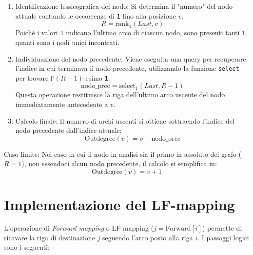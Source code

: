 \documentclass[a4paper,11pt]{article}
\begin{document}
\begin{enumerate}
    \item Identificazione lessicografica del nodo: Si determina il "numero" del nodo attuale contando le occorrenze di \texttt{1} fino alla posizione $v$.
    $$ R = \text{rank}_1(Last, v) $$
    Poiché i valori \texttt{1} indicano l'ultimo arco di ciascun nodo, sono presenti tanti \texttt{1} quanti sono i nodi unici incontrati.
    
    \item Individuazione del nodo precedente: Viene eseguita una query per recuperare l'indice in cui terminava il nodo precedente, utilizzando la funzione \texttt{select} per trovare l'$(R-1)$-esimo \texttt{1}:
    $$ \text{nodo\_prec} = \text{select}_1(Last, R-1) $$
    Questa operazione restituisce la riga dell'ultimo arco uscente del nodo immediatamente antecedente a $v$.
    
    \item Calcolo finale: Il numero di archi uscenti si ottiene sottraendo l'indice del nodo precedente dall'indice attuale:
    $$ \text{Outdegree}(v) = v - \text{nodo\_prec} $$
\end{enumerate}

Caso limite: Nel caso in cui il nodo in analisi sia il primo in assoluto del grafo ($R = 1$), non essendoci alcun nodo precedente, il calcolo si semplifica in:
$$ \text{Outdegree}(v) = v + 1 $$

\section{Implementazione del LF-mapping}
L'operazione di \textit{Forward mapping} o LF-mapping ($j = \text{Forward}[i]$) permette di ricavare la riga di destinazione $j$ seguendo l'arco posto alla riga $i$. I passaggi logici sono i seguenti:
\end{document}
